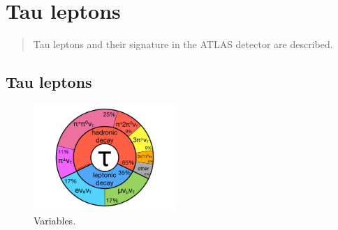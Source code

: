 \chapter[Tau leptons][Tau leptons]{Tau leptons}

\begin{quote}
  Tau leptons and their signature in the ATLAS detector are described.
\end{quote}

\section{Tau leptons}
\label{sec:taus-theory}

\begin{figure}[tp]
  \centering
  \includegraphics[width=0.48\textwidth]{figures/piecharts/taudecay}
  \caption{Variables.}
  \label{fig:taus-decaypie}
\end{figure}



